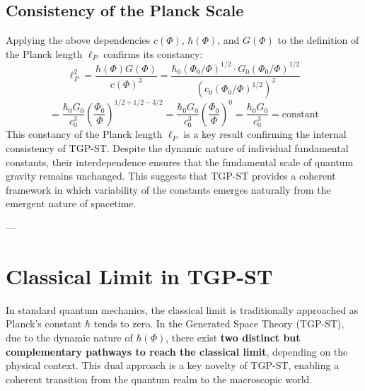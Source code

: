 \documentclass[11pt,a4paper]{article}
\begin{document}
\subsection{Consistency of the Planck Scale}
Applying the above dependencies $c(\Phi)$, $\hbar(\Phi)$, and $G(\Phi)$ to the definition of the Planck length $\ell_P$ confirms its constancy:
\[
    \ell_P^2 = \frac{\hbar(\Phi) G(\Phi)}{c(\Phi)^3} = \frac{\hbar_0 (\Phi_0/\Phi)^{1/2} \cdot G_0 (\Phi_0/\Phi)^{1/2}}{(c_0 (\Phi_0/\Phi)^{1/2})^3}
\]
\[
    = \frac{\hbar_0 G_0}{c_0^3} \left(\frac{\Phi_0}{\Phi}\right)^{1/2 + 1/2 - 3/2} = \frac{\hbar_0 G_0}{c_0^3} \left(\frac{\Phi_0}{\Phi}\right)^0 = \frac{\hbar_0 G_0}{c_0^3} = \text{constant}
\]
This constancy of the Planck length $\ell_P$ is a key result confirming the internal consistency of TGP-ST. Despite the dynamic nature of individual fundamental constants, their interdependence ensures that the fundamental scale of quantum gravity remains unchanged. This suggests that TGP-ST provides a coherent framework in which variability of the constants emerges naturally from the emergent nature of spacetime.

---

\section{Classical Limit in TGP-ST}
\label{sec:GranicaKlasyczna}

In standard quantum mechanics, the classical limit is traditionally approached as Planck’s constant $\hbar$ tends to zero. In the Generated Space Theory (TGP-ST), due to the dynamic nature of $\hbar(\Phi)$, there exist \textbf{two distinct but complementary pathways to reach the classical limit}, depending on the physical context. This dual approach is a key novelty of TGP-ST, enabling a coherent transition from the quantum realm to the macroscopic world.
\end{document}
